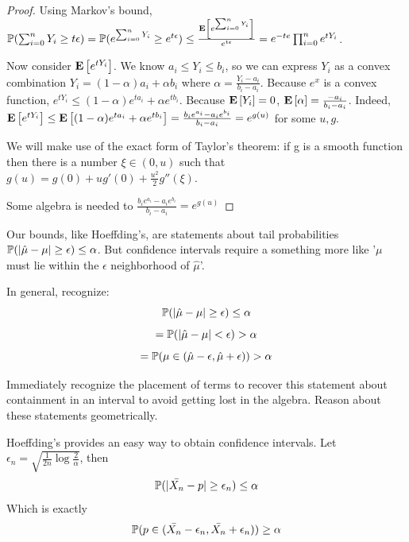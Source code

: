 \documentclass[10pt]{article}
\begin{document}
\begin{proof}
    Using Markov's bound, $\P(\sum_{i=0}^{n} Y_i \geq t\epsilon) =
    \P(e^{\sum_{i=0}^{n} Y_i} \geq e^{t\epsilon}) \leq
    \frac{\E{e^{\sum_{i=0}^{n} Y_i}}}{e^{t\epsilon}} =
    e^{-te}\prod_{i=0}^{n}e^{tY_i}$.

    Now consider $\E{e^{tY_i}}$. We know $a_i \leq Y_i \leq b_i$, so we can
    express $Y_i$ as a convex combination $Y_i = (1-\alpha)a_i + \alpha b_i$
    where $\alpha = \frac{Y_i - a_i}{b_i - a_i}$. Because $e^x$ is a convex
    function, $e^{tY_i} \leq (1-\alpha)e^{t a_i} + \alpha e^{t b_i}$. Because
    $\E{Y_i} = 0$, $\E{\alpha} = \frac{-a_i}{b_i - a_i}$. Indeed, $\E{e^{tY_i}}
    \leq \E{(1-\alpha)e^{t a_i} + \alpha e^{t b_i}} = \frac{b_ie^{a_i} - a_ie^{b_i}}{b_i - a_i} = e^{g(u)}$ for some $u, g$.

    We will make use of the exact form of Taylor's theorem: if g is a smooth
    function then there is a number $\xi \in (0, u)$ such that $g(u) = g(0) +
    ug'(0) + \frac{u^2}{2}g''(\xi)$. 

    Some algebra is needed to $\frac{b_ie^{a_i} - a_ie^{b_i}}{b_i - a_i} = e^{g(u)}$
\end{proof}

\begin{note}
    Our bounds, like Hoeffding's, are statements about tail probabilities $\P(|\hat{\mu} -
    \mu| \geq \epsilon) \leq \alpha$. But confidence intervals require a
    something more like '$\mu$ must lie within the $\epsilon$ neighborhood of
    $\hat{\mu}$'.

    In general, recognize:
    \[\P(|\hat{\mu} - \mu| \geq \epsilon) \leq \alpha\]
    \[= \P(|\hat{\mu} - \mu| < \epsilon) > \alpha\]
    \[= \P(\mu \in (\hat{\mu} - \epsilon, \hat{\mu} + \epsilon)) > \alpha\]

    Immediately recognize the placement of terms to recover this statement
    about containment in an interval to avoid getting lost in the algebra.
    Reason about these statements geometrically.
\end{note}

\begin{note}
    Hoeffding's provides an easy way to obtain confidence intervals.  Let
    $\epsilon_n = \sqrt{\frac{1}{2n}\log{\frac{2}{\alpha}}}$, then
    \[\P(|\bar{X_n} - p| \geq \epsilon_n) \leq \alpha\]
    Which is exactly \[\P(p \in (\bar{X_n}-\epsilon_n, \bar{X_n}+\epsilon_n)) \geq \alpha\]
\end{note}
\end{document}
